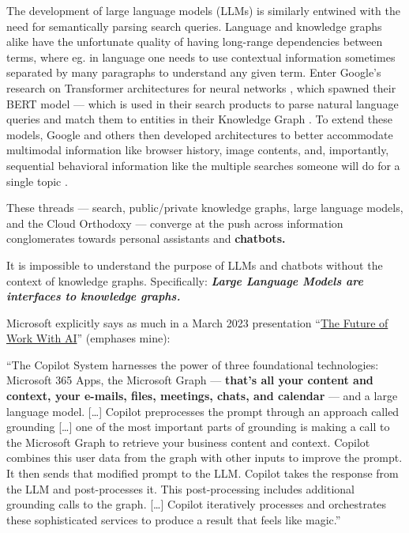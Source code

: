 \documentclass{article}
\renewenvironment{leftbar}
{\vspace{6pt}\def\FrameCommand{\hspace{0em}\vrule width 0.5pt \hspace{1em}}\MakeFramed {\advance\hsize-\width \FrameRestore}}
{\endMakeFramed}
\begin{document}
The development of large language models (LLMs) is similarly entwined
with the need for semantically parsing search queries. Language and
knowledge graphs alike have the unfortunate quality of having long-range
dependencies between terms, where eg. in language one needs to use
contextual information sometimes separated by many paragraphs to
understand any given term. Enter Google's research on Transformer
architectures for neural networks \cite{vaswaniAttentionAllYou2017} , which spawned their BERT model \cite{devlinBERTPretrainingDeep2019}  --- which is used in their search
products to parse natural language queries and match them to entities in
their Knowledge Graph \cite{nayakUnderstandingSearchesBetter2019} . To extend these models, Google and others then developed
architectures to better accommodate multimodal information like browser
history, image contents, and, importantly, sequential behavioral
information like the multiple searches someone will do for a single
topic \cite{nayakMUMNewAI2021, tayHyperGridTransformersSingle2021, huUniTMultimodalMultitask2021} .

These threads --- search, public/private knowledge graphs, large
language models, and the Cloud Orthodoxy --- converge at the push across
information conglomerates towards personal assistants and
\textbf{chatbots.}

It is impossible to understand the purpose of LLMs and chatbots without
the context of knowledge graphs. Specifically: \textbf{\emph{Large
Language Models are interfaces to knowledge graphs.}}

Microsoft explicitly says as much in a March 2023 presentation
``\href{https://www.youtube.com/watch?v=Bf-dbS9CcRU}{The Future of Work
With AI}'' (emphases mine):

\begin{leftbar}
``The Copilot System harnesses the power of three foundational
technologies: Microsoft 365 Apps, the Microsoft Graph --- \textbf{that's
all your content and context, your e-mails, files, meetings, chats, and
calendar} --- and a large language model. {[}\ldots{]} Copilot
preprocesses the prompt through an approach called grounding
{[}\ldots{]} one of the most important parts of grounding is making a
call to the Microsoft Graph to retrieve your business content and
context. Copilot combines this user data from the graph with other
inputs to improve the prompt. It then sends that modified prompt to the
LLM. Copilot takes the response from the LLM and post-processes it. This
post-processing includes additional grounding calls to the graph.
{[}\ldots{]} Copilot iteratively processes and orchestrates these
sophisticated services to produce a result that feels like magic.'' \cite{microsoftFutureWorkAI2023} 
\end{leftbar}
\end{document}
